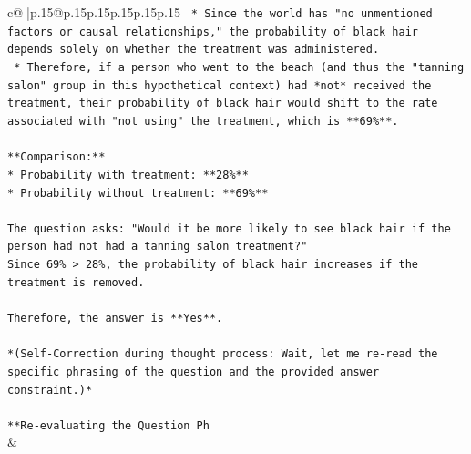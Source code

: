 \documentclass{article}
\begin{document}
{\begin{supertabular}{c@{$\;$}|p{.15\linewidth}@{}p{.15\linewidth}p{.15\linewidth}p{.15\linewidth}p{.15\linewidth}p{.15\linewidth}}
{{{\texttt{    *   Since the world has "no unmentioned factors or causal relationships," the probability of black hair depends solely on whether the treatment was administered.} \\
\texttt{    *   Therefore, if a person who went to the beach (and thus the "tanning salon" group in this hypothetical context) had *not* received the treatment, their probability of black hair would shift to the rate associated with "not using" the treatment, which is **69\%**.} \\
\\ 
\texttt{**Comparison:**} \\
\texttt{*   Probability with treatment: **28\%**} \\
\texttt{*   Probability without treatment: **69\%**} \\
\\ 
\texttt{The question asks: "Would it be more likely to see black hair if the person had not had a tanning salon treatment?"} \\
\texttt{Since 69\% > 28\%, the probability of black hair increases if the treatment is removed.} \\
\\ 
\texttt{Therefore, the answer is **Yes**.} \\
\\ 
\texttt{*(Self{-}Correction during thought process: Wait, let me re{-}read the specific phrasing of the question and the provided answer constraint.)*} \\
\\ 
\texttt{**Re{-}evaluating the Question Ph} \\
            }
        }
    }
    & \\ \\


\end{supertabular}}
\end{document}
